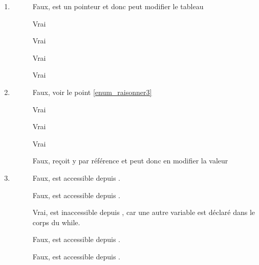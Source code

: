 \begin{Answer}[ref={ex:fonction_raisonner3}]
  \begin{enumerate}
  \item \label{enum_raisonner3}
\begin{description}
\item[]Faux,  est un pointeur et donc  peut modifier le tableau
\item[] Vrai
\item[] Vrai
\item[] Vrai
\item[] Vrai
\end{description}

     \item
\begin{description}
\item[] Faux, voir le point \ref{enum_raisonner3}
\item[] Vrai
\item[] Vrai
\item[] Vrai
\item[] Faux,  reçoit y par référence et peut donc en modifier la valeur
\end{description}

     \item
\begin{description}
\item[] Faux,  est accessible depuis .
\item[] Faux,  est accessible depuis .
\item[] Vrai,  est inaccessible
  depuis , car une autre variable  est
  déclaré dans le corps du while.
\item[] Faux,  est accessible depuis .
\item[] Faux,  est accessible depuis .
\end{description}
\end{enumerate}

\end{Answer}